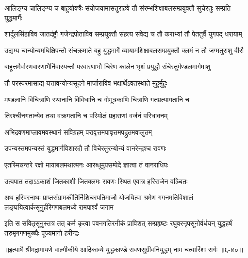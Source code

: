 \twolineshloka
{आलिङ्ग्य चालिङ्ग्य च बाहुयोक्त्रैः संयोजयामासतुराहवे तौ}
{संरम्भशिक्षाबलसम्प्रयुक्तौ सुचेरतुः सम्प्रति युद्धमार्गैः} %

\twolineshloka
{शार्दूलसिंहाविव जातदंष्ट्रौ गजेन्द्रपोताविव सम्प्रयुक्तौ}
{संहत्य संवेद्य च तौ कराभ्यां तौ पेततुर्वै युगपद् धरायाम्} %

\twolineshloka
{उद्यम्य चान्योन्यमधिक्षिपन्तौ संचक्रमाते बहु युद्धमार्गे}
{व्यायामशिक्षाबलसम्प्रयुक्तौ क्लमं न तौ जग्मतुराशु वीरौ} %

\twolineshloka
{बाहूत्तमैर्वारणवारणाभैर्निवारयन्तौ परवारणाभौ}
{चिरेण कालेन भृशं प्रयुद्धौ संचेरतुर्मण्डलमार्गमाशु} %

\twolineshloka
{तौ परस्परमासाद्य यत्तावन्योन्यसूदने}
{मार्जाराविव भक्षार्थेऽवतस्थाते मुहुर्मुहुः} %

\twolineshloka
{मण्डलानि विचित्राणि स्थानानि विविधानि च}
{गोमूत्रकाणि चित्राणि गतप्रत्यागतानि च} %

\twolineshloka
{तिरश्चीनगतान्येव तथा वक्रगतानि च}
{परिमोक्षं प्रहाराणां वर्जनं परिधावनम्} %

\twolineshloka
{अभिद्रवणमाप्लावमवस्थानं सविग्रहम्}
{परावृत्तमपावृत्तमपद्रुतमवप्लुतम्} %

\twolineshloka
{उपन्यस्तमपन्यस्तं युद्धमार्गविशारदौ}
{तौ विचेरतुरन्योन्यं वानरेन्द्रश्च रावणः} %

\twolineshloka
{एतस्मिन्नन्तरे रक्षो मायाबलमथात्मनः}
{आरब्धुमुपसम्पेदे ज्ञात्वा तं वानराधिपः} %

\twolineshloka
{उत्पपात तदाऽऽकाशं जितकाशी जितक्लमः}
{रावणः स्थित एवात्र हरिराजेन वञ्चितः} %

\twolineshloka
{अथ हरिवरनाथः प्राप्तसंग्रामकीर्तिर्निशिचरपतिमाजौ योजयित्वा श्रमेण}
{गगनमतिविशालं लङ्घयित्वार्कसूनुर्हरिगणबलमध्ये रामपार्श्वं जगाम} %

\twolineshloka
{इति स सवितृसूनुस्तत्र तत् कर्म कृत्वा पवनगतिरनीकं प्राविशत् सम्प्रहृष्टः}
{रघुवरनृपसूनोर्वर्धयन् युद्धहर्षं तरुमृगगणमुख्यैः पूज्यमानो हरीन्द्रः} %


॥इत्यार्षे श्रीमद्रामायणे वाल्मीकीये आदिकाव्ये युद्धकाण्डे रावणसुग्रीवनियुद्धम् नाम चत्वारिंशः सर्गः ॥६-४०॥
